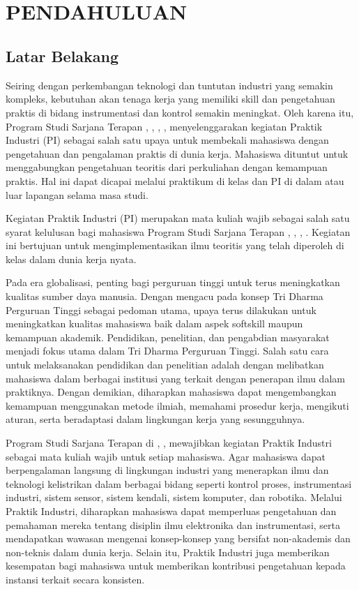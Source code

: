 \chapter[PENDAHULUAN]{\\ PENDAHULUAN}

\section{Latar Belakang}
Seiring dengan perkembangan teknologi dan tuntutan industri yang semakin kompleks, kebutuhan akan tenaga kerja yang memiliki skill dan pengetahuan praktis di bidang instrumentasi dan kontrol semakin meningkat. Oleh karena itu, Program Studi Sarjana Terapan {\prodi}, {\departemen}, {\fakultas}, {\universitas}, menyelenggarakan kegiatan Praktik Industri (PI) sebagai salah satu upaya untuk membekali mahasiswa dengan pengetahuan dan pengalaman praktis di dunia kerja. Mahasiswa dituntut untuk menggabungkan pengetahuan teoritis dari perkuliahan dengan kemampuan praktis. Hal ini dapat dicapai melalui praktikum di kelas dan PI di dalam atau luar lapangan selama masa studi.

Kegiatan Praktik Industri (PI) merupakan mata kuliah wajib sebagai salah satu syarat kelulusan bagi mahasiswa Program Studi Sarjana Terapan {\prodi}, {\departemen}, {\fakultas}, {\universitas}. Kegiatan ini bertujuan untuk mengimplementasikan ilmu teoritis yang telah diperoleh di kelas dalam dunia kerja nyata.

Pada era globalisasi, penting bagi perguruan tinggi untuk terus meningkatkan kualitas sumber daya manusia. Dengan mengacu pada konsep Tri Dharma Perguruan Tinggi sebagai pedoman utama, upaya terus dilakukan untuk meningkatkan kualitas mahasiswa baik dalam aspek softskill maupun kemampuan akademik. Pendidikan, penelitian, dan pengabdian masyarakat menjadi fokus utama dalam Tri Dharma Perguruan Tinggi. Salah satu cara untuk melaksanakan pendidikan dan penelitian adalah dengan melibatkan mahasiswa dalam berbagai institusi yang terkait dengan penerapan ilmu dalam praktiknya. Dengan demikian, diharapkan mahasiswa dapat mengembangkan kemampuan menggunakan metode ilmiah, memahami prosedur kerja, mengikuti aturan, serta beradaptasi dalam lingkungan kerja yang sesungguhnya.

Program Studi Sarjana Terapan {\prodi} di {\departemen}, {\fakultas}, {\universitas} mewajibkan kegiatan Praktik Industri sebagai mata kuliah wajib untuk setiap mahasiswa. Agar mahasiswa dapat berpengalaman langsung di lingkungan industri yang menerapkan ilmu dan teknologi kelistrikan dalam berbagai bidang seperti kontrol proses, instrumentasi industri, sistem sensor, sistem kendali, sistem komputer, dan robotika. Melalui Praktik Industri, diharapkan mahasiswa dapat memperluas pengetahuan dan pemahaman mereka tentang disiplin ilmu elektronika dan instrumentasi, serta mendapatkan wawasan mengenai konsep-konsep yang bersifat non-akademis dan non-teknis dalam dunia kerja. Selain itu, Praktik Industri juga memberikan kesempatan bagi mahasiswa untuk memberikan kontribusi pengetahuan kepada instansi terkait secara konsisten.

